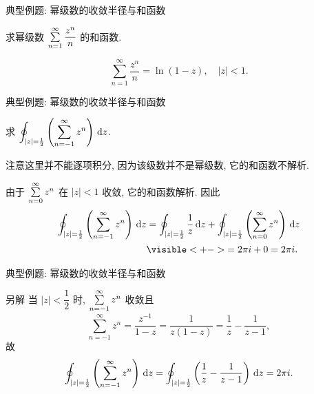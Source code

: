 \begin{frame}{典型例题: 幂级数的收敛半径与和函数}
\begin{exercise}
求幂级数 $\sum\limits_{n=1}^\infty\dfrac{z^n}n$ 的和函数.
\end{exercise}
\begin{answer}
\[\sum_{n=1}^\infty\frac{z^n}n=\ln(1-z),\quad|z|<1.\]
\end{answer}
\end{frame}


\begin{frame}{典型例题: 幂级数的收敛半径与和函数}
\begin{example}
求 $\displaystyle\oint_{|z|=\frac12}\left(\sum_{n=-1}^\infty z^n\right)\,\mathrm{d} z$.
\end{example}
\onslide<+->
注意这里并不能逐项积分, 因为该级数并不是幂级数, 它的和函数不解析.
\begin{solution}
由于 $\sum\limits_{n=0}^\infty z^n$ 在 $|z|<1$ 收敛,
\onslide<+->
它的和函数解析.
\onslide<+->
因此
\begin{align*}
\oint_{|z|=\frac12}\left(\sum_{n=-1}^\infty z^n\right)\diff z
	&=\oint_{|z|=\frac12}\frac1z\diff z+\oint_{|z|=\frac12}\left(\sum_{n=0}^\infty z^n\right)\diff z\\
&\visible<+->{=2\pi i+0=2\pi i.}
\end{align*}
\end{solution}
\end{frame}


\begin{frame}{典型例题: 幂级数的收敛半径与和函数}
\beqskip{3pt}
\begin{block}{另解}
当 $|z|<\dfrac12$ 时, $\sum\limits_{n=-1}^\infty z^n$ 收敛且
\[\sum_{n=-1}^\infty z^n=\frac{z^{-1}}{1-z}=\frac1{z(1-z)}=\frac1z-\frac1{z-1},\]
\onslide<+->
故
\[\oint_{|z|=\frac12}\left(\sum_{n=-1}^\infty z^n\right)\,\mathrm{d} z
=\oint_{|z|=\frac12}\left(\frac1z-\frac1{z-1}\right)\,\mathrm{d} z=2\pi i.\]
\end{block}
\endgroup
\end{frame}
